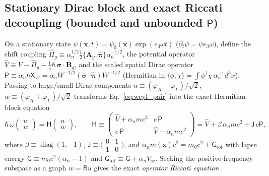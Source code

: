 \documentclass[aps,prd,onecolumn,tightenlines,nofootinbib,notitlepage,10pt,floatfix]{revtex4-2}
\theoremstyle{indentedtheorem}
\begin{document}
\subsection{Stationary Dirac block and exact Riccati decoupling (bounded and unbounded \texorpdfstring{$\mathsf{P}$}{P})}
\label{sec:riccati_decoupling}

On a stationary state $\psi(\mathbf{x},t)=\psi_0(\mathbf{x})\exp(e_3\omega t)$ ($\partial_t\psi=\psi e_3\omega$), define the shift coupling $\hat{\Pi}_g\equiv\alpha_n^{1/2}\tfrac{1}{2}\{\mathbf{A}_g,\hat{\boldsymbol{\pi}}\}\alpha_n^{-1/2}$, the potential operator $\hat{V}\equiv V-\hat{\Pi}_g-\tfrac{1}{4}\hbar\,\boldsymbol{\sigma}\cdot\mathbf{B}_g$, and the scaled spatial Dirac operator $\mathsf{P}\equiv\alpha_n\hbar\mathsf{X}_W=\alpha_n W^{-1/2}(\boldsymbol{\sigma}\cdot\hat{\boldsymbol{\pi}})W^{-1/2}$ (Hermitian in $\langle\phi,\chi\rangle=\int\phi^\dagger\chi\,\alpha_n^{-1}d^3x$). Passing to large/small Dirac components $u\equiv(\varphi_R-\varphi_L)/\sqrt{2}$, $w\equiv(\varphi_R+\varphi_L)/\sqrt{2}$ transforms Eq.~\eqref{eq:weyl_pair} into the exact Hermitian block equation
\begin{equation}
    \hbar\,\omega\begin{pmatrix} u \\ w \end{pmatrix} = \mathsf{H}\begin{pmatrix} u \\ w \end{pmatrix} , \qquad \mathsf{H} \equiv \begin{pmatrix} \hat{V}+\alpha_n mc^2 & c\,\mathsf{P} \\ c\,\mathsf{P} & \hat{V}-\alpha_n mc^2 \end{pmatrix} = \hat{V} + \beta\,\alpha_n mc^2 + \mathsf{J}\,c\mathsf{P} ,
    \label{eq:block_equation}
\end{equation}
where $\beta\equiv\operatorname{diag}(1,-1)$, $\mathsf{J}\equiv\bigl(\begin{smallmatrix}0&1\\1&0\end{smallmatrix}\bigr)$, and $\alpha_n m(\mathbf{x})c^2=m_0 c^2+\mathsf{G}_\text{tot}$ with lapse energy $\mathsf{G}\equiv m_0 c^2(\alpha_n-1)$ and $\mathsf{G}_\text{tot}\equiv\mathsf{G}+\alpha_n V_\text{sc}$. Seeking the positive-frequency subspace as a graph $w=\mathsf{R}u$ gives the exact \emph{operator Riccati equation}~\citep{Heully1986Diagonalisation,KutzelniggLiu2005Quasirelativistic}
\end{document}
